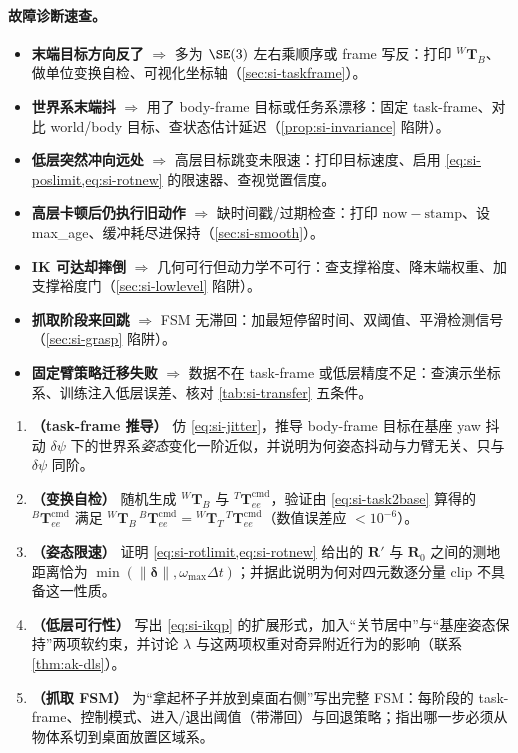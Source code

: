 \paragraph{故障诊断速查。}
\begin{itemize}
  \item \textbf{末端目标方向反了} $\Rightarrow$ 多为 $\SE(3)$ 左右乘顺序或 frame 写反：打印 ${}^{W}\mathbf{T}_{B}$、做单位变换自检、可视化坐标轴（\cref{sec:si-taskframe}）。
  \item \textbf{世界系末端抖} $\Rightarrow$ 用了 body-frame 目标或任务系漂移：固定 task-frame、对比 world/body 目标、查状态估计延迟（\cref{prop:si-invariance} 陷阱）。
  \item \textbf{低层突然冲向远处} $\Rightarrow$ 高层目标跳变未限速：打印目标速度、启用 \cref{eq:si-poslimit,eq:si-rotnew} 的限速器、查视觉置信度。
  \item \textbf{高层卡顿后仍执行旧动作} $\Rightarrow$ 缺时间戳/过期检查：打印 $\mathrm{now}-\mathrm{stamp}$、设 max\_age、缓冲耗尽进保持（\cref{sec:si-smooth}）。
  \item \textbf{IK 可达却摔倒} $\Rightarrow$ 几何可行但动力学不可行：查支撑裕度、降末端权重、加支撑裕度门（\cref{sec:si-lowlevel} 陷阱）。
  \item \textbf{抓取阶段来回跳} $\Rightarrow$ FSM 无滞回：加最短停留时间、双阈值、平滑检测信号（\cref{sec:si-grasp} 陷阱）。
  \item \textbf{固定臂策略迁移失败} $\Rightarrow$ 数据不在 task-frame 或低层精度不足：查演示坐标系、训练注入低层误差、核对 \cref{tab:si-transfer} 五条件。
\end{itemize}

\begin{practice}[本章综合练习]
\begin{enumerate}
  \item \textbf{（task-frame 推导）} 仿 \cref{eq:si-jitter}，推导 body-frame 目标在基座 yaw 抖动 $\delta\psi$ 下的世界系\emph{姿态}变化一阶近似，并说明为何姿态抖动与力臂无关、只与 $\delta\psi$ 同阶。
  \item \textbf{（变换自检）} 随机生成 ${}^{W}\mathbf{T}_{B}$ 与 ${}^{T}\mathbf{T}_{ee}^{\mathrm{cmd}}$，验证由 \cref{eq:si-task2base} 算得的 ${}^{B}\mathbf{T}_{ee}^{\mathrm{cmd}}$ 满足 ${}^{W}\mathbf{T}_{B}\,{}^{B}\mathbf{T}_{ee}^{\mathrm{cmd}}={}^{W}\mathbf{T}_{T}\,{}^{T}\mathbf{T}_{ee}^{\mathrm{cmd}}$（数值误差应 $<10^{-6}$）。
  \item \textbf{（姿态限速）} 证明 \cref{eq:si-rotlimit,eq:si-rotnew} 给出的 $\mathbf R'$ 与 $\mathbf R_0$ 之间的测地距离恰为 $\min(\|\boldsymbol\delta\|,\omega_{\max}\Delta t)$；并据此说明为何对四元数逐分量 clip 不具备这一性质。
  \item \textbf{（低层可行性）} 写出 \cref{eq:si-ikqp} 的扩展形式，加入“关节居中”与“基座姿态保持”两项软约束，并讨论 $\lambda$ 与这两项权重对奇异附近行为的影响（联系 \cref{thm:ak-dls}）。
  \item \textbf{（抓取 FSM）} 为“拿起杯子并放到桌面右侧”写出完整 FSM：每阶段的 task-frame、控制模式、进入/退出阈值（带滞回）与回退策略；指出哪一步必须从物体系切到桌面放置区域系。
\end{enumerate}
\end{practice}

